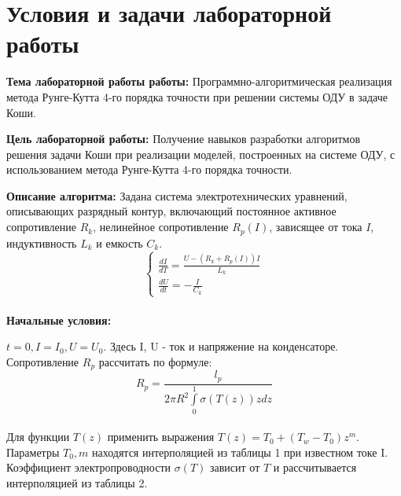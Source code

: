 \chapter{Условия и задачи лабораторной работы}
 	
 	\hspace{0cm} \textbf{Тема лабораторной работы работы:} 
 	Программно-алгоритмическая реализация метода Рунге-Кутта 4-го порядка точности при решении системы ОДУ в задаче Коши.
 	
 	\hspace{0cm} \textbf{Цель лабораторной работы:} Получение навыков разработки алгоритмов решения задачи Коши при реализации моделей, построенных на системе ОДУ, с использованием метода Рунге-Кутта 4-го порядка точности.
 	
 	\hspace{0cm} \textbf{Описание алгоритма:} Задана система электротехнических уравнений, описывающих разрядный контур, включающий постоянное активное сопротивление $R_k$, нелинейное сопротивление $R_p(I)$, зависящее от тока $I$, индуктивность $L_k$ и емкость $C_k$. \\
 	
 	 \begin{equation*}
        \begin{cases}
            \frac{dI}{dT} = \frac{U - (R_k + R_p (I))I}{L_k}\\
            \frac{dU}{dt} = -\frac{I}{C_k}
        \end{cases}
    \end{equation*} \\
    
    \hspace{0cm} \textbf{Начальные условия:}
    
    $t = 0, I = I_0, U = U_0.$
    Здесь I, U - ток и напряжение на конденсаторе.
    Сопротивление $R_p$ рассчитать по формуле: \\
    
    \begin{equation*}
         R_p = \frac{l_p}{2\pi R^2\int\limits_0^1\sigma(T(z))zdz}
    \end{equation*} \\
    
    Для функции $T(z)$ применить выражения $T(z) = T_0 + (T_w - T_0) z^m.$ Параметры $T_0, m$ находятся интерполяцией из таблицы 1 при известном токе I. Коэффициент электропроводности $\sigma(T)$ зависит от $T$ и рассчитывается интерполяцией из таблицы 2. \\
    
